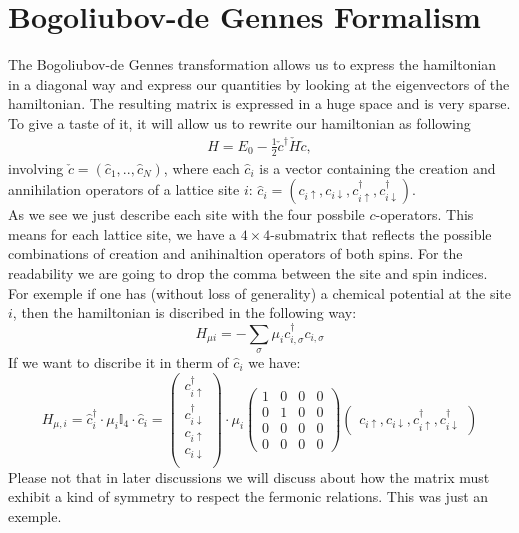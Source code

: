 \documentclass[../main.tex]{subfile}
\begin{document}
\section{Bogoliubov-de Gennes Formalism}
The Bogoliubov-de Gennes transformation allows us to express the hamiltonian in a diagonal way and express our quantities 
by looking at the eigenvectors of the hamiltonian. The resulting matrix is expressed in a huge space and is very sparse.\\

To give a taste of it, it will allow us to rewrite our hamiltonian as following
\begin{align}
    H = E_0 - \frac{1}{2} \check{c}^\dagger \check{H} \check{c}, \label{eq:BdG_intro_H}
\end{align}
involving $\check{c} = (\hat{c}_1,..,\hat{c}_N)$, where each $\hat{c}_i$ is a
 vector containing the creation and annihilation operators of a lattice site $i$:
$\hat{c}_i = (c_{i\uparrow} ,c_{i\downarrow}, c_{i\uparrow}^{\dagger} ,c_{i\downarrow}^{\dagger})$.\\

As we see we just describe each site with the four possbile $c$-operators. This means for each lattice site,
we have a $4\times4$-submatrix that reflects the possible combinations of creation and anihinaltion operators of both spins. 
For the readability we are going to drop the comma between the site and spin indices.\\
For exemple if one has (without loss of generality) a chemical potential at the site $i$, 
 then the hamiltonian is discribed in the following way:
\[
    H_{\mu i} = -\sum_{\sigma} \mu_i c_{i,\sigma}^{\dagger} c_{i,\sigma}
\]
If we want to discribe it in therm of $\hat{c}_i$ we have:
\[
    H_{\mu,i} = \hat{c}_i^{\dagger}\cdot \mu_i \mathbb{I}_4 \cdot\hat{c}_i = \begin{pmatrix}
        c_{i\uparrow}^{\dagger} \\c_{i\downarrow}^{\dagger}\\ c_{i\uparrow} \\c_{i\downarrow}\\
    \end{pmatrix}\cdot \mu_i
     \begin{pmatrix}
        1 & 0 & 0 & 0\\
        0 & 1 & 0 & 0\\
        0 & 0 & 0 & 0\\
        0 & 0 & 0 & 0
    \end{pmatrix}\begin{pmatrix}c_{i\uparrow} ,c_{i\downarrow}, c_{i\uparrow}^{\dagger} ,c_{i\downarrow}^{\dagger}\end{pmatrix}
\]
Please not that in later discussions we will discuss about how the matrix must exhibit a kind of symmetry to respect the fermonic relations. This was just an exemple.\\
\end{document}
